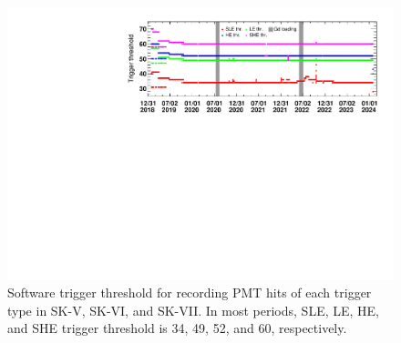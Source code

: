 \begin{figure}[h]
	\centering
	\includegraphics[width=15cm]{Figures/SK/softtrg_thr_time_vari_SK567}
	\caption[Software trigger threshold for recording PMT hits of each trigger type in SK-V, SK-VI, and SK-VII]{
	Software trigger threshold for recording PMT hits of each trigger type in SK-V, SK-VI, and SK-VII.
	In most periods, SLE, LE, HE, and SHE trigger threshold is 34, 49, 52, and 60, respectively.
	}\label{SK_softtrg_SK567}
\end{figure}






\newpage

